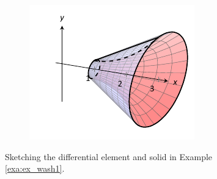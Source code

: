 \begin{solution}
{\begin{figure}[H]
\begin{subfigure}[t]{0.33\textwidth}
			\includegraphics[width=\textwidth]{figures/figwash1b}
			\label{fig:figwash1c}
			\caption{}    
		\end{subfigure} 
	\caption{Sketching the differential element and solid in Example \ref{exa:ex_wash1}. \label{fig:wash1}}
\end{figure}	


}
\end{solution}



